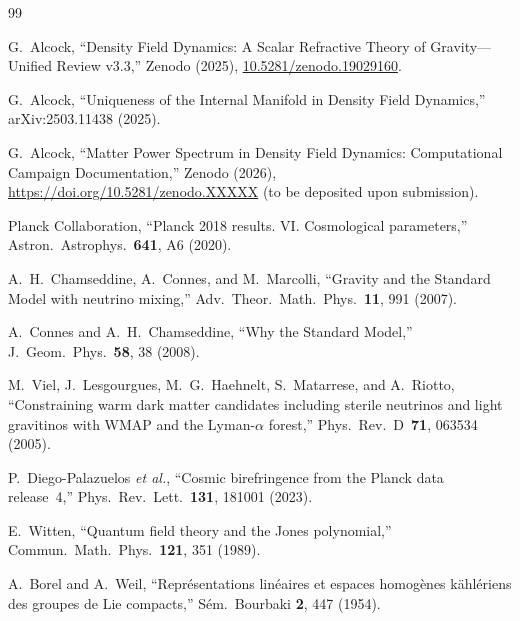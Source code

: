 \documentclass[aps,prd,twocolumn,superscriptaddress,showpacs,floatfix,nofootinbib]{revtex4-2}
\theoremstyle{definition}
\theoremstyle{remark}
\begin{document}
\begin{thebibliography}{99}

G.~Alcock, ``Density Field Dynamics: A Scalar Refractive
Theory of Gravity---Unified Review v3.3,'' Zenodo (2025),
\href{https://doi.org/10.5281/zenodo.19029160}%
{10.5281/zenodo.19029160}.

G.~Alcock, ``Uniqueness of the Internal Manifold in
Density Field Dynamics,'' arXiv:2503.11438 (2025).

G.~Alcock, ``Matter Power Spectrum in Density Field
Dynamics: Computational Campaign Documentation,''
Zenodo (2026),
\url{https://doi.org/10.5281/zenodo.XXXXX}
(to be deposited upon submission).

Planck Collaboration, ``Planck 2018 results. VI.
Cosmological parameters,'' Astron.\ Astrophys.\
\textbf{641}, A6 (2020).

A.~H.~Chamseddine, A.~Connes, and M.~Marcolli,
``Gravity and the Standard Model with neutrino mixing,''
Adv.\ Theor.\ Math.\ Phys.\ \textbf{11}, 991 (2007).

A.~Connes and A.~H.~Chamseddine, ``Why the Standard Model,''
J.\ Geom.\ Phys.\ \textbf{58}, 38 (2008).

M.~Viel, J.~Lesgourgues, M.~G.~Haehnelt, S.~Matarrese,
and A.~Riotto, ``Constraining warm dark matter candidates
including sterile neutrinos and light gravitinos with
WMAP and the Lyman-$\alpha$ forest,'' Phys.\ Rev.\ D\
\textbf{71}, 063534 (2005).

P.~Diego-Palazuelos \textit{et al.}, ``Cosmic birefringence
from the Planck data release~4,'' Phys.\ Rev.\ Lett.\
\textbf{131}, 181001 (2023).

\bibitem{Witten1989}
E.~Witten, ``Quantum field theory and the Jones polynomial,''
Commun.\ Math.\ Phys.\ \textbf{121}, 351 (1989).

\bibitem{BorelWeil1954}
A.~Borel and A.~Weil, ``Repr\'esentations lin\'eaires et
espaces homog\`enes k\"ahl\'eriens des groupes de Lie
compacts,'' S\'em.\ Bourbaki \textbf{2}, 447 (1954).

\end{thebibliography}
\end{document}
